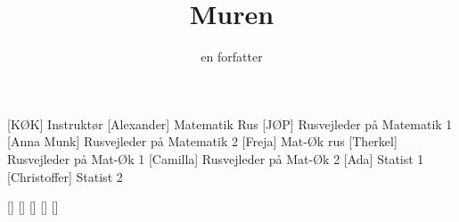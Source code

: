 \documentclass[a4paper,11pt]{article}
\title{Muren}
\author{en forfatter}
\begin{document}
\maketitle

\begin{roles}
[KØK] Instruktør
[Alexander] Matematik Rus
[JØP] Rusvejleder på Matematik 1
[Anna Munk] Rusvejleder på Matematik 2
[Freja] Mat-Øk rus
[Therkel] Rusvejleder på Mat-Øk 1
[Camilla] Rusvejleder på Mat-Øk 2
[Ada] Statist 1
[Christoffer] Statist 2
\end{roles}

\begin{props}
[]
[]
[]
[]
[]
\end{props}
\end{document}
